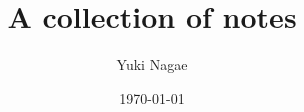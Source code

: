 \documentclass[12pt]{article}
\title{%
\textbf{A collection of notes}
}
\date{\today}
\author{Yuki Nagae}
\begin{document}
\maketitle
\bigskip


\newpage

\tableofcontents
\newpage


\newpage


\newpage
\end{document}
